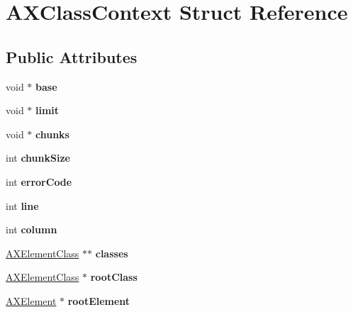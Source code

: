 \hypertarget{structAXClassContext}{\section{A\-X\-Class\-Context Struct Reference}
\label{structAXClassContext}
}
\subsection*{Public Attributes}
\begin{DoxyCompactItemize}
\item 
\hypertarget{structAXClassContext_aba3c7ea3f7d93bc2968dd04b0a19fa89}{void $\ast$ {\bfseries base}}\label{structAXClassContext_aba3c7ea3f7d93bc2968dd04b0a19fa89}

\item 
\hypertarget{structAXClassContext_a28d38849966cbb5f2860f10804356217}{void $\ast$ {\bfseries limit}}\label{structAXClassContext_a28d38849966cbb5f2860f10804356217}

\item 
\hypertarget{structAXClassContext_a7828a90d71ea9a09cc1e40b8c79384eb}{void $\ast$ {\bfseries chunks}}\label{structAXClassContext_a7828a90d71ea9a09cc1e40b8c79384eb}

\item 
\hypertarget{structAXClassContext_a140d2a11e3431a11bf3d12462ed7541a}{int {\bfseries chunk\-Size}}\label{structAXClassContext_a140d2a11e3431a11bf3d12462ed7541a}

\item 
\hypertarget{structAXClassContext_acada6bf20d1b8bb03d9b5f9e2b48f47c}{int {\bfseries error\-Code}}\label{structAXClassContext_acada6bf20d1b8bb03d9b5f9e2b48f47c}

\item 
\hypertarget{structAXClassContext_ac0dbe06cc5997420829430c8ebc89f20}{int {\bfseries line}}\label{structAXClassContext_ac0dbe06cc5997420829430c8ebc89f20}

\item 
\hypertarget{structAXClassContext_a152b7ec2d68c7b548bef82512f6a8d66}{int {\bfseries column}}\label{structAXClassContext_a152b7ec2d68c7b548bef82512f6a8d66}

\item 
\hypertarget{structAXClassContext_a19c5e869dbd5fe79c23a5b070eeb8cda}{\hyperlink{structAXElementClass}{A\-X\-Element\-Class} $\ast$$\ast$ {\bfseries classes}}\label{structAXClassContext_a19c5e869dbd5fe79c23a5b070eeb8cda}

\item 
\hypertarget{structAXClassContext_aaa9a82f7a6037fa38c2dc4382ed96935}{\hyperlink{structAXElementClass}{A\-X\-Element\-Class} $\ast$ {\bfseries root\-Class}}\label{structAXClassContext_aaa9a82f7a6037fa38c2dc4382ed96935}

\item 
\hypertarget{structAXClassContext_a145f94bc96659a808a852c308dd442db}{\hyperlink{structAXElement}{A\-X\-Element} $\ast$ {\bfseries root\-Element}}\label{structAXClassContext_a145f94bc96659a808a852c308dd442db}

\end{DoxyCompactItemize}


